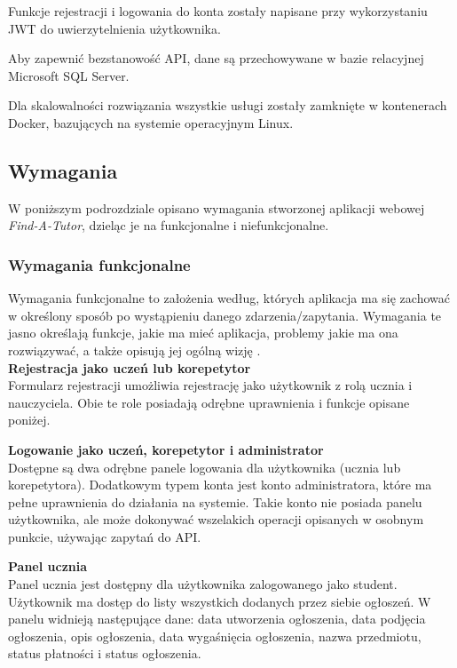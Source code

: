 \documentclass[12pt]{article}
\numberwithin{figure}{section}
\begin{document}
\begin{sloppypar}
Funkcje rejestracji i logowania do konta zostały napisane przy wykorzystaniu JWT do uwierzytelnienia użytkownika.

Aby zapewnić bezstanowość API, dane są przechowywane w bazie relacyjnej Microsoft SQL Server.

Dla skalowalności rozwiązania wszystkie usługi zostały zamknięte w kontenerach Docker, bazujących na systemie operacyjnym Linux.

\subsection{Wymagania}
W poniższym podrozdziale opisano wymagania stworzonej aplikacji webowej \textit{Find-A-Tutor}, dzieląc je na funkcjonalne i niefunkcjonalne. 

\subsubsection{Wymagania funkcjonalne}
Wymagania funkcjonalne to założenia według, których aplikacja ma się zachować w określony sposób po wystąpieniu danego zdarzenia/zapytania. Wymagania te jasno określają funkcje, jakie ma mieć aplikacja, problemy jakie ma ona rozwiązywać, a także opisują jej ogólną wizję \cite{funkcjonalne}. \\
\noindent
\textbf{Rejestracja jako uczeń lub korepetytor}\\
\indent
Formularz rejestracji umożliwia rejestrację jako użytkownik z rolą ucznia i nauczyciela. Obie te role posiadają odrębne uprawnienia i funkcje opisane poniżej.

\noindent
\textbf{Logowanie jako uczeń, korepetytor i administrator}\\
\indent  
Dostępne są dwa odrębne panele logowania dla użytkownika (ucznia lub korepetytora). Dodatkowym typem konta jest konto administratora, które ma pełne uprawnienia do działania na systemie. Takie konto nie posiada panelu użytkownika, ale może dokonywać wszelakich operacji opisanych w osobnym punkcie, używając zapytań do API.

\noindent
\textbf{Panel ucznia}\\
\indent
Panel ucznia jest dostępny dla użytkownika zalogowanego jako student. Użytkownik ma dostęp do listy wszystkich dodanych przez siebie ogłoszeń. W panelu widnieją następujące dane: data utworzenia ogłoszenia, data podjęcia ogłoszenia, opis ogłoszenia, data wygaśnięcia ogłoszenia, nazwa przedmiotu, status płatności i status ogłoszenia.


\end{sloppypar}
\end{document}
